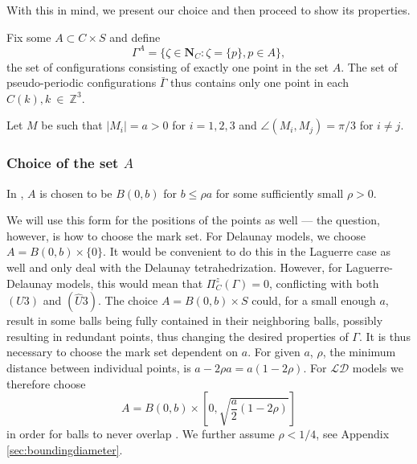 With this in mind, we present our choice and then proceed to show its properties.\newline 

\noindent Fix some $A \subset C\times S$ and define
$$\Gamma^A = \{\zeta \in \mathbf N_C: \zeta = \{p\}, p \in A\},$$
the set of configurations consisting of exactly one point in the set $A$. The set of pseudo-periodic configurations $\bar\Gamma$ thus contains only one point in each $C(k), k~\in~\mathbb Z^3$.

Let $M$ be such that $|M_i| = a > 0$ for $i=1,2,3$ and $\angle(M_i,M_j) = \pi / 3$ for $i\neq j$.

\subsubsection{Choice of the set $A$}
In \cite{DDG12}, $A$ is chosen to be $B(0,b)$ for $b\leq \rho a$ for some sufficiently small $\rho >0$. 

We will use this form for the positions of the points as well --- the question, however, is how to choose the mark set. For Delaunay models, we choose $A=B(0,b)\times\{0\}$. It would be convenient to do this in the Laguerre case as well and only deal with the Delaunay tetrahedrization. However, for Laguerre-Delaunay models, this  would mean that $\Pi^z_C(\Gamma) = 0$, conflicting with both $(U3)$ and $(\hat U3)$. The choice $A=B(0,b)\times S$ could, for a small enough $a$, result in some balls being fully contained in their neighboring balls, possibly resulting in redundant points, thus changing the desired properties of $\Gamma$. It is thus necessary to choose the mark set dependent on $a$. For given $a$, $\rho$, the minimum distance between individual points, is $a-2\rho a = a(1-2\rho)$. For $\mathcal {LD}$ models we therefore choose 
\begin{equation}\label{eq:choiceA} A = B(0,b)\times \left[0, \sqrt{\frac a2(1-2\rho)}\right] \end{equation}
in order for balls to never overlap . We further assume $\rho < 1/4$, see Appendix \ref{sec:boundingdiameter}.




